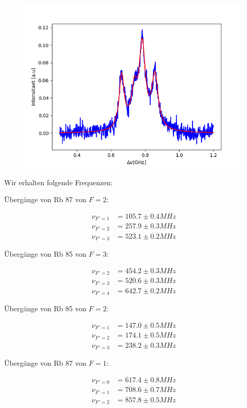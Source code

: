 \documentclass[a4paper,parskip]{scrartcl}
\begin{document}
\begin{figure}[h]
\includegraphics[scale = 0.5]{./saturation/peak4/gaussCorrected.png}
\end{figure}

Wir erhalten folgende Frequenzen:

Übergänge von Rb 87 von $F=2$:

\begin{align*}
\nu_{F'=1} &= 105.7 \pm 0.4 MHz \\
\nu_{F'=2} &= 257.9 \pm 0.3 MHz \\
\nu_{F'=3} &= 523.1 \pm 0.2 MHz  
\end{align*}

Übergänge von Rb 85 von $F=3$:

\begin{align*}
\nu_{F'=2} &= 454.2 \pm 0.3 MHz \\
\nu_{F'=3} &= 520.6 \pm 0.3 MHz \\
\nu_{F'=4} &= 642.7 \pm 0.2 MHz  
\end{align*}

Übergänge von Rb 85 von $F=2$:

\begin{align*}
\nu_{F'=1} &= 147.0 \pm 0.5 MHz \\
\nu_{F'=2} &= 174.1 \pm 0.5 MHz \\
\nu_{F'=3} &= 238.2 \pm 0.3 MHz  
\end{align*}

Übergänge von Rb 87 von $F=1$:

\begin{align*}
\nu_{F'=0} &= 617.4 \pm 0.8 MHz \\
\nu_{F'=1} &= 708.6 \pm 0.7 MHz \\
\nu_{F'=2} &= 857.8 \pm 0.5 MHz  
\end{align*}
\end{document}
